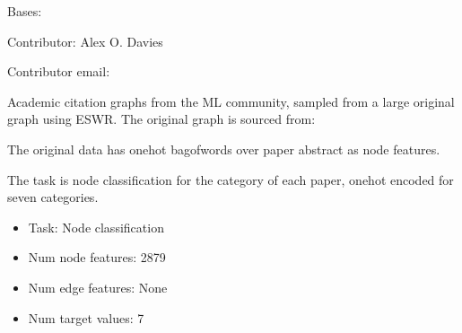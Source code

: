 \documentclass[letterpaper,10pt,english]{sphinxhowto}
\begin{document}
\begin{fulllineitems}
\label{\detokenize{datasets/real:datasets.real.CoraDataset}}
\pysigstartsignatures
{}
\pysigstopsignatures
\sphinxAtStartPar
Bases: 

\sphinxAtStartPar
Contributor: Alex O. Davies

\sphinxAtStartPar
Contributor email: 

\sphinxAtStartPar
Academic citation graphs from the ML community, sampled from a large original graph using ESWR.
The original graph is sourced from:
\begin{quote}

\sphinxAtStartPar
{}
\end{quote}

\sphinxAtStartPar
The original data has one\sphinxhyphen{}hot bag\sphinxhyphen{}of\sphinxhyphen{}words over paper abstract as node features.

\sphinxAtStartPar
The task is node classification for the category of each paper, one\sphinxhyphen{}hot encoded for seven categories.
\begin{itemize}
\item {} 
\sphinxAtStartPar
Task: Node classification

\item {} 
\sphinxAtStartPar
Num node features: 2879

\item {} 
\sphinxAtStartPar
Num edge features: None

\item {} 
\sphinxAtStartPar
Num target values: 7


\end{itemize}
\end{fulllineitems}
\end{document}
